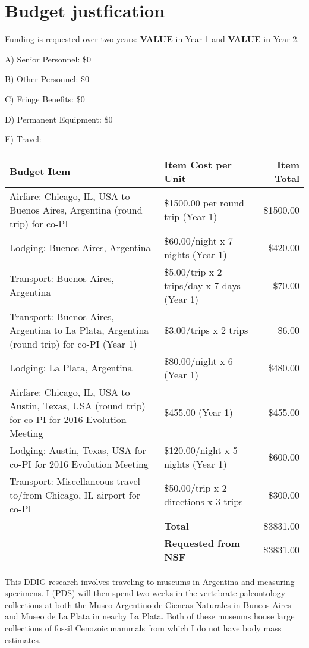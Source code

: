 \documentclass[11pt,letterpaper]{article}
\begin{document}
\setcounter{secnumdepth}{0}
\section{Budget justfication}

Funding is requested over two years: \textbf{VALUE} in Year 1 and \textbf{VALUE} in Year 2.

A) Senior Personnel: \$0

B) Other Personnel: \$0

C) Fringe Benefits: \$0

D) Permanent Equipment: \$0

E) Travel:

\begin{tabular}[H]{p{7.5cm} p{4.5cm} r}
  Budget Item & Item Cost per Unit & Item Total \\
  \hline
  Airfare: Chicago, IL, USA to Buenos Aires, Argentina (round trip) for co-PI & \$1500.00 per round trip (Year 1) & \$1500.00 \\
  Lodging: Buenos Aires, Argentina & \$60.00/night x 7 nights (Year 1) & \$420.00 \\
  Transport: Buenos Aires, Argentina & \$5.00/trip x 2 trips/day x 7 days (Year 1) & \$70.00 \\
  Transport: Buenos Aires, Argentina to La Plata, Argentina (round trip) for co-PI (Year 1) & \$3.00/trips x 2 trips & \$6.00 \\
  Lodging: La Plata, Argentina & \$80.00/night x 6 (Year 1) & \$480.00 \\
  Airfare: Chicago, IL, USA to Austin, Texas, USA (round trip) for co-PI for 2016 Evolution Meeting & \$455.00 (Year 1) & \$455.00 \\
  Lodging: Austin, Texas, USA for co-PI for 2016 Evolution Meeting & \$120.00/night x 5 nights (Year 1) & \$600.00 \\
  Transport: Miscellaneous travel to/from Chicago, IL airport for co-PI & \$50.00/trip x 2 directions x 3 trips & \$300.00 \\
  & \textbf{Total} & \$3831.00 \\
  & \textbf{Requested from NSF} & \$3831.00
\end{tabular}

This DDIG research involves traveling to museums in Argentina and measuring specimens. I (PDS) will then spend two weeks in the vertebrate paleontology collections at both the Museo Argentino de Ciencas Naturales in Buneos Aires and Museo de La Plata in nearby La Plata. Both of these museums house large collections of fossil Cenozoic mammals from which I do not have body mass estimates.
\end{document}
